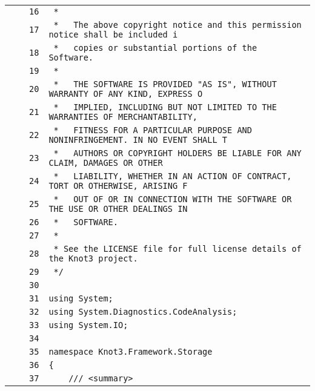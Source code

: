 \documentclass[a4paper,10pt]{article}
\begin{document}
\begin{longtable}[l]{lrrl}
\cellcolor{gray} &  & \verb~16~ & \verb~ *~\\
\cellcolor{gray} &  & \verb~17~ & \verb~ *   The above copyright notice and this permission notice shall be included i~\\
\cellcolor{gray} &  & \verb~18~ & \verb~ *   copies or substantial portions of the Software.~\\
\cellcolor{gray} &  & \verb~19~ & \verb~ *~\\
\cellcolor{gray} &  & \verb~20~ & \verb~ *   THE SOFTWARE IS PROVIDED "AS IS", WITHOUT WARRANTY OF ANY KIND, EXPRESS O~\\
\cellcolor{gray} &  & \verb~21~ & \verb~ *   IMPLIED, INCLUDING BUT NOT LIMITED TO THE WARRANTIES OF MERCHANTABILITY,~\\
\cellcolor{gray} &  & \verb~22~ & \verb~ *   FITNESS FOR A PARTICULAR PURPOSE AND NONINFRINGEMENT. IN NO EVENT SHALL T~\\
\cellcolor{gray} &  & \verb~23~ & \verb~ *   AUTHORS OR COPYRIGHT HOLDERS BE LIABLE FOR ANY CLAIM, DAMAGES OR OTHER~\\
\cellcolor{gray} &  & \verb~24~ & \verb~ *   LIABILITY, WHETHER IN AN ACTION OF CONTRACT, TORT OR OTHERWISE, ARISING F~\\
\cellcolor{gray} &  & \verb~25~ & \verb~ *   OUT OF OR IN CONNECTION WITH THE SOFTWARE OR THE USE OR OTHER DEALINGS IN~\\
\cellcolor{gray} &  & \verb~26~ & \verb~ *   SOFTWARE.~\\
\cellcolor{gray} &  & \verb~27~ & \verb~ *~\\
\cellcolor{gray} &  & \verb~28~ & \verb~ * See the LICENSE file for full license details of the Knot3 project.~\\
\cellcolor{gray} &  & \verb~29~ & \verb~ */~\\
\cellcolor{gray} &  & \verb~30~ & \verb~~\\
\cellcolor{gray} &  & \verb~31~ & \verb~using System;~\\
\cellcolor{gray} &  & \verb~32~ & \verb~using System.Diagnostics.CodeAnalysis;~\\
\cellcolor{gray} &  & \verb~33~ & \verb~using System.IO;~\\
\cellcolor{gray} &  & \verb~34~ & \verb~~\\
\cellcolor{gray} &  & \verb~35~ & \verb~namespace Knot3.Framework.Storage~\\
\cellcolor{gray} &  & \verb~36~ & \verb~{~\\
\cellcolor{gray} &  & \verb~37~ & \verb~    /// <summary>~\\

\end{longtable}
\end{document}
